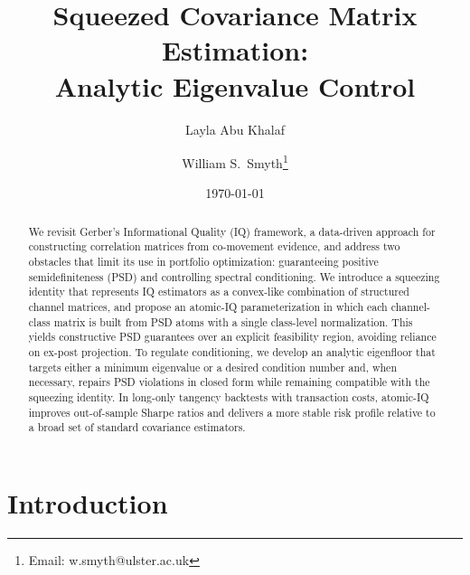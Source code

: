 \documentclass[12pt,letterpaper]{article}
\title{Squeezed Covariance Matrix Estimation:\\Analytic Eigenvalue Control}
\author{Layla Abu Khalaf}
\author{William S.~Smyth\thanks{Email: w.smyth@ulster.ac.uk}}
\affil{Intelligent Systems Research Centre, Ulster University, Derry, UK}
\date{\today}
\begin{document}
\maketitle


\begin{abstract}
We revisit Gerber’s Informational Quality (IQ) framework, a data-driven approach for constructing correlation matrices from co-movement evidence, and address two obstacles that limit its use in portfolio optimization: guaranteeing positive semidefiniteness (PSD) and controlling spectral conditioning. We introduce a squeezing identity that represents IQ estimators as a convex-like combination of structured channel matrices, and propose an atomic-IQ parameterization in which each channel-class matrix is built from PSD atoms with a single class-level normalization. This yields constructive PSD guarantees over an explicit feasibility region, avoiding reliance on ex-post projection. To regulate conditioning, we develop an analytic eigenfloor that targets either a minimum eigenvalue or a desired condition number and, when necessary, repairs PSD violations in closed form while remaining compatible with the squeezing identity. In long-only tangency backtests with transaction costs, atomic-IQ improves out-of-sample Sharpe ratios and delivers a more stable risk profile relative to a broad set of standard covariance estimators.
\end{abstract}

\section{Introduction}
\end{document}
